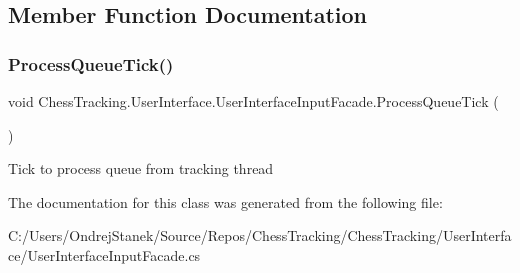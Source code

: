 \subsection{Member Function Documentation}
\mbox{\label{class_chess_tracking_1_1_user_interface_1_1_user_interface_input_facade_a1f17a5883cc0d513edd5a1e400087a7e}} 
\subsubsection{\texorpdfstring{ProcessQueueTick()}{ProcessQueueTick()}}
{\footnotesize\ttfamily void Chess\+Tracking.\+User\+Interface.\+User\+Interface\+Input\+Facade.\+Process\+Queue\+Tick (\begin{DoxyParamCaption}{ }\end{DoxyParamCaption})}



Tick to process queue from tracking thread 



The documentation for this class was generated from the following file\+:\begin{DoxyCompactItemize}
\item 
C\+:/\+Users/\+Ondrej\+Stanek/\+Source/\+Repos/\+Chess\+Tracking/\+Chess\+Tracking/\+User\+Interface/User\+Interface\+Input\+Facade.\+cs\end{DoxyCompactItemize}
